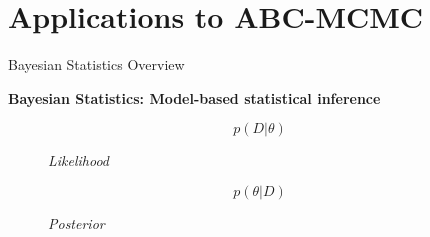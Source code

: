 \documentclass{beamer}
\begin{document}
	\section{Applications to ABC-MCMC}
	\begin{frame}{Bayesian Statistics Overview}
	
	\textbf{Bayesian Statistics: Model-based statistical inference}
	
	\begin{figure}
		
		\begin{equation} \tag{1}
			p(D|\theta)
		\end{equation}
	\caption{\textit{Likelihood}} \pause
	
		\begin{equation} \tag{2}
			p(\theta|D)
		\end{equation}
	\caption{\textit{Posterior}}
	
	\end{figure}
	
	\end{frame}
\end{document}
